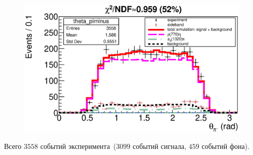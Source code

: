 \documentclass{beamer}
\begin{document}
\begin{frame}
\begin{minipage}[t]{0.48\linewidth}
\begin{figure}
    \end{figure}
  \end{minipage}
  \begin{minipage}[t]{0.48\linewidth}
    \begin{figure}
      \includegraphics[width=\linewidth]{figures/theta_piminus_g705.eps}
    \end{figure}
  \end{minipage}
  \scriptsize
  Всего $3558$ событий эксперимента~($3099$ событий сигнала, $459$ событий фона).
\end{frame}
\end{document}
